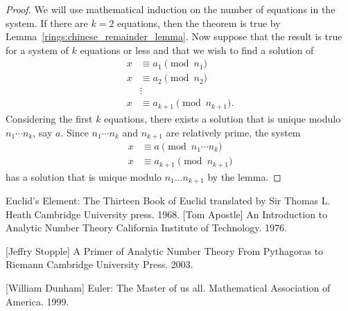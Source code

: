 \documentclass[12pt]{article}
\begin{document}
\begin{proof}
We will use mathematical induction on the number of equations in the
system. If there are $k= 2$ equations, then the theorem is true by
Lemma~\ref{rings:chinese_remainder_lemma}. Now suppose that the result is true for a system of $k$
equations or less and that we wish to find a solution of
\begin{align*}
x & \equiv  a_1 \pmod{n_1} \\
x & \equiv  a_2 \pmod{n_2} \\
  & \vdots  \\
x & \equiv  a_{k+1} \pmod{n_{k+1}}.
\end{align*}
Considering the first $k$ equations, there exists a solution that is
unique modulo $n_1 \cdots n_k$, say $a$. Since $n_1 \cdots n_k$ and
$n_{k+1}$ are relatively prime, the system
\begin{align*}
x & \equiv  a \pmod{n_1 \cdots n_k } \\
x & \equiv  a_{k+1} \pmod{n_{k+1}}
\end{align*}
has a solution that is unique modulo $n_1 \ldots n_{k+1}$ by the
lemma.
\end{proof}

\newpage
 \begin{thebibliography}{9}

Euclid's Element:
The Thirteen Book of Euclid translated by Sir Thomas L. Heath
Cambridge University press. 1968.
[Tom Apostle]
An Introduction to Analytic Number Theory
California Institute of Technology. 1976.

[Jeffry Stopple]
A Primer of Analytic Number Theory From Pythagoras to Riemann
Cambridge  University  Press. 2003.

[William Dunham]
Euler: The Master of us all.
Mathematical Association of America. 1999.
\end{thebibliography}
\end{document}
